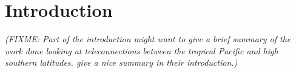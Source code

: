 \section{Introduction}

\textit{(FIXME: Part of the introduction might want to give a brief summary of the work done looking at teleconnections between the tropical Pacific and high southern latitudes. \citet{Ciasto2015} give a nice summary in their introduction.)}